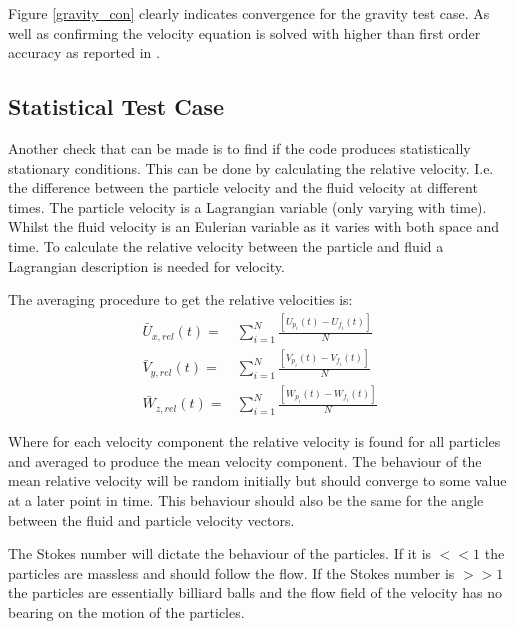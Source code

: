 \documentclass[../Interim_Report_Master]{subfiles}
\begin{document}
Figure \ref{gravity_con} clearly indicates convergence for the gravity test case. As well as confirming the velocity equation is solved with higher than first order accuracy as reported in \cite{Elijah_GPU_Report}.

\subsection{Statistical Test Case}\label{stat_test_case}
Another check that can be made is to find if the code produces statistically stationary conditions. This can be done by calculating the relative velocity. I.e. the difference between the particle velocity and the fluid velocity at different times. The particle velocity is a Lagrangian variable (only varying with time). Whilst the fluid velocity is an Eulerian variable as it varies with both space and time. To calculate the relative velocity between the particle and fluid a Lagrangian description is needed for velocity.

The averaging procedure to get the relative velocities is:
\begin{subequations}
\begin{eqnarray}
\bar{U}_{x,rel}(t) =& \sum_{i=1}^{N}\frac{\left[U_{p_i}(t)-U_{f_i}(t)\right]}{N} \\
\bar{V}_{y,rel}(t) =& \sum_{i=1}^{N}\frac{\left[V_{p_i}(t)-V_{f_i}(t)\right]}{N} \\
\bar{W}_{z,rel}(t) =& \sum_{i=1}^{N}\frac{\left[W_{p_i}(t)-W_{f_i}(t)\right]}{N}
\end{eqnarray}
\end{subequations}

Where for each velocity component the relative velocity is found for all particles and averaged to produce the mean velocity component. The behaviour of the mean relative velocity will be random initially but should converge to some value at a later point in time. This behaviour should also be the same for the angle between the fluid and particle velocity vectors. 

The Stokes number will dictate the behaviour of the particles. If it is $<<1$ the particles are massless and should follow the flow. If the Stokes number is $>>1$ the particles are essentially billiard balls and the flow field of the velocity has no bearing on the motion of the particles.
\end{document}
